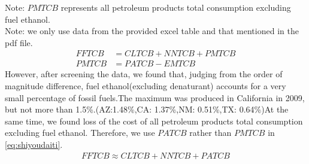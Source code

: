 Note: $ PMTCB  $ represents all petroleum products total consumption excluding fuel ethanol.\\
Note: we only use data from the provided excel table and that mentioned in the pdf file.
\begin{align}
FFTCB &= CLTCB + NNTCB + PMTCB\\
PMTCB &= PATCB - EMTCB
\end{align}
However, after screening the data, we found that, judging from the order of magnitude difference, fuel ethanol(excluding denaturant) accounts for a very small percentage of fossil fuels.The maximum was produced in California in 2009, but not more than 1.5\%.(AZ:1.48\%,CA: 1.37\%,NM: 0.51\%,TX: 0.64\%)At the same time, we found loss of the cost of all petroleum products total consumption excluding fuel ethanol.
Therefore, we use $ PATCB $ rather than $ PMTCB $ in \autoref{eq:shiyoudaiti}.
\begin{align}
FFTCB \approx CLTCB + NNTCB + PATCB\label{eq:shiyoudaiti}
\end{align}
%
%
%
%
%
%
%
%
%
%
%
%
%

